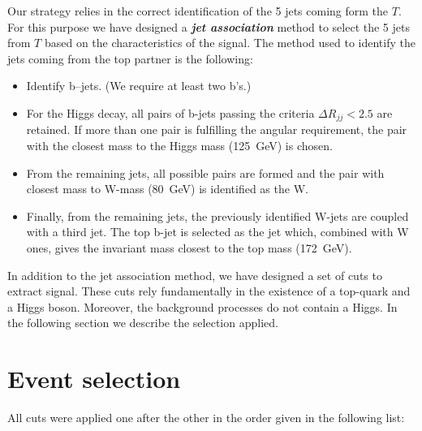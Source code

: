 Our strategy relies in the correct identification of the 5 jets coming form the $T$. For this purpose we have designed a \textbf{\textit{jet association}} method to select the 5 jets from $T$ based on the characteristics of the signal. The method used to identify the jets coming from the top partner is the following:
\begin{itemize}
\item Identify b--jets. (We require at least two b's.)
\item For the Higgs decay, all pairs of b-jets passing the criteria $\Delta R_{jj} <2.5$ are retained. If more than one pair is fulfilling the angular requirement, the pair with the closest mass to the Higgs mass (125~GeV) is chosen.
\item From the remaining jets, all possible pairs are formed and the pair with closest mass to W-mass (80~GeV) is identified as the W.
\item Finally, from the remaining jets, the previously identified W-jets are coupled with a third jet. The top b-jet is selected as the jet which, combined with W ones, gives the invariant mass closest to the top mass (172~GeV).
\end{itemize}

In addition to the jet association method, we have designed a set of cuts to extract signal. These cuts rely fundamentally in the existence of a top-quark and a Higgs boson. Moreover, the background processes do not contain a Higgs. In the following section we describe the selection applied.

\section{Event selection}
\label{sec:Psel}

All cuts were applied one after the other in the order given in the following list:


